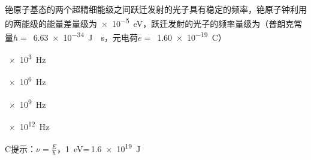 铯原子基态的两个超精细能级之间跃迁发射的光子具有稳定的频率，铯原子钟利用的两能级的能量差量级为\qty{e-5}{eV}，跃迁发射的光子的频率量级为（普朗克常量\(h =\) \,\qty{6.63e-34}{J\cdot s}，元电荷\(e =\) \,\qty{1.60e-19}{C}）\paren[C]
\begin{choices}
	\item \qty{e3}{Hz}
	\item \qty{e6}{Hz}
	\item \qty{e9}{Hz}
	\item \qty{e12}{Hz}
\end{choices}
\begin{answer}
	C\qquad 提示：\(\nu = \frac{E}{h}\)，\qty{1}{eV}=\,\qty{1.6e19}{J}
\end{answer}